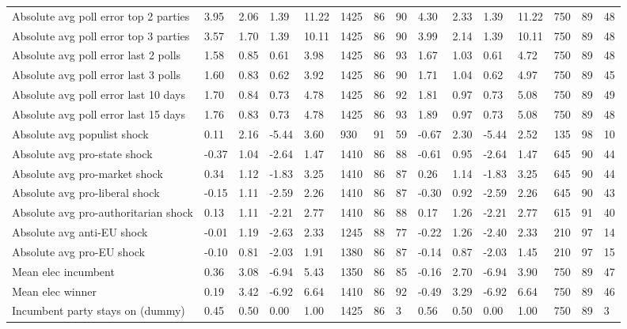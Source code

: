 \begin{longtable}{lllllllllllllll}
Absolute avg poll error top 2 parties & 3.95 & 2.06 & 1.39 & 11.22 & 1425 & 86 & 90 & 4.30 & 2.33 & 1.39 & 11.22 & 750 & 89 & 48\\
Absolute avg poll error top 3 parties & 3.57 & 1.70 & 1.39 & 10.11 & 1425 & 86 & 90 & 3.99 & 2.14 & 1.39 & 10.11 & 750 & 89 & 48\\
Absolute avg poll error last 2 polls & 1.58 & 0.85 & 0.61 & 3.98 & 1425 & 86 & 93 & 1.67 & 1.03 & 0.61 & 4.72 & 750 & 89 & 48\\
\addlinespace
Absolute avg poll error last 3 polls & 1.60 & 0.83 & 0.62 & 3.92 & 1425 & 86 & 90 & 1.71 & 1.04 & 0.62 & 4.97 & 750 & 89 & 45\\
Absolute avg poll error last 10 days & 1.70 & 0.84 & 0.73 & 4.78 & 1425 & 86 & 92 & 1.81 & 0.97 & 0.73 & 5.08 & 750 & 89 & 49\\
Absolute avg poll error last 15 days & 1.76 & 0.83 & 0.73 & 4.78 & 1425 & 86 & 93 & 1.89 & 0.97 & 0.73 & 5.08 & 750 & 89 & 48\\
Absolute avg populist shock & 0.11 & 2.16 & -5.44 & 3.60 & 930 & 91 & 59 & -0.67 & 2.30 & -5.44 & 2.52 & 135 & 98 & 10\\
Absolute avg pro-state shock & -0.37 & 1.04 & -2.64 & 1.47 & 1410 & 86 & 88 & -0.61 & 0.95 & -2.64 & 1.47 & 645 & 90 & 44\\
\addlinespace
Absolute avg pro-market shock & 0.34 & 1.12 & -1.83 & 3.25 & 1410 & 86 & 87 & 0.26 & 1.14 & -1.83 & 3.25 & 645 & 90 & 44\\
Absolute avg pro-liberal shock & -0.15 & 1.11 & -2.59 & 2.26 & 1410 & 86 & 87 & -0.30 & 0.92 & -2.59 & 2.26 & 645 & 90 & 43\\
Absolute avg pro-authoritarian shock & 0.13 & 1.11 & -2.21 & 2.77 & 1410 & 86 & 88 & 0.17 & 1.26 & -2.21 & 2.77 & 615 & 91 & 40\\
Absolute avg anti-EU shock & -0.01 & 1.19 & -2.63 & 2.33 & 1245 & 88 & 77 & -0.22 & 1.26 & -2.40 & 2.33 & 210 & 97 & 14\\
Absolute avg pro-EU shock & -0.10 & 0.81 & -2.03 & 1.91 & 1380 & 86 & 87 & -0.14 & 0.87 & -2.03 & 1.45 & 210 & 97 & 15\\
\addlinespace
Mean elec incumbent & 0.36 & 3.08 & -6.94 & 5.43 & 1350 & 86 & 85 & -0.16 & 2.70 & -6.94 & 3.90 & 750 & 89 & 47\\
Mean elec winner & 0.19 & 3.42 & -6.92 & 6.64 & 1410 & 86 & 92 & -0.49 & 3.29 & -6.92 & 6.64 & 750 & 89 & 46\\
Incumbent party stays on (dummy) & 0.45 & 0.50 & 0.00 & 1.00 & 1425 & 86 & 3 & 0.56 & 0.50 & 0.00 & 1.00 & 750 & 89 & 3\\

\end{longtable}
